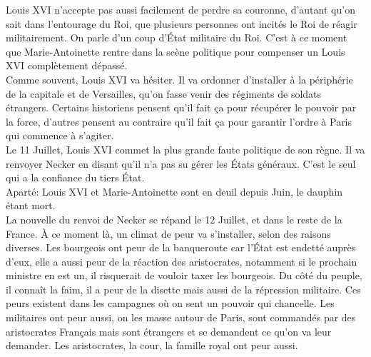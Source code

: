 \documentclass[10pt, a4paper, openany]{book}
\begin{document}
Louis XVI n'accepte pas aussi facilement de perdre sa couronne, d'autant qu'on sait dans l'entourage du Roi, que plusieurs personnes ont incités le Roi de réagir militairement. On parle d'un coup d'État militaire du Roi. C'est à ce moment que Marie-Antoinette rentre dans la scène politique pour compenser un Louis XVI complètement dépassé. \\
Comme souvent, Louis XVI va hésiter. Il va ordonner d'installer à la périphérie de la capitale et de Versailles, qu'on fasse venir des régiments de soldats étrangers. Certains historiens pensent qu'il fait ça pour récupérer le pouvoir par la force, d'autres pensent au contraire qu'il fait ça pour garantir l'ordre à Paris qui commence à s'agiter. \\
Le 11 Juillet, Louis XVI commet la plus grande faute politique de son règne. Il va renvoyer Necker en disant qu'il n'a pas su gérer les États généraux. C'est le seul qui a la confiance du tiers État. \\
Aparté: Louis XVI et Marie-Antoinette sont en deuil depuis Juin, le dauphin étant mort. \\
La nouvelle du renvoi de Necker se répand le 12 Juillet, et dans le reste de la France. À ce moment là, un climat de peur va s'installer, selon des raisons diverses. Les bourgeois ont peur de la banqueroute car l'État est endetté auprès d'eux, elle a aussi peur de la réaction des aristocrates, notamment si le prochain ministre en est un, il risquerait de vouloir taxer les bourgeois. Du côté du peuple, il connaît la faim, il a peur de la disette mais aussi de la répression militaire. Ces peurs existent dans les campagnes où on sent un pouvoir qui chancelle. Les militaires ont peur aussi, on les masse autour de Paris, sont commandés par des aristocrates Français mais sont étrangers et se demandent ce qu'on va leur demander. Les aristocrates, la cour, la famille royal ont peur aussi.
\end{document}
